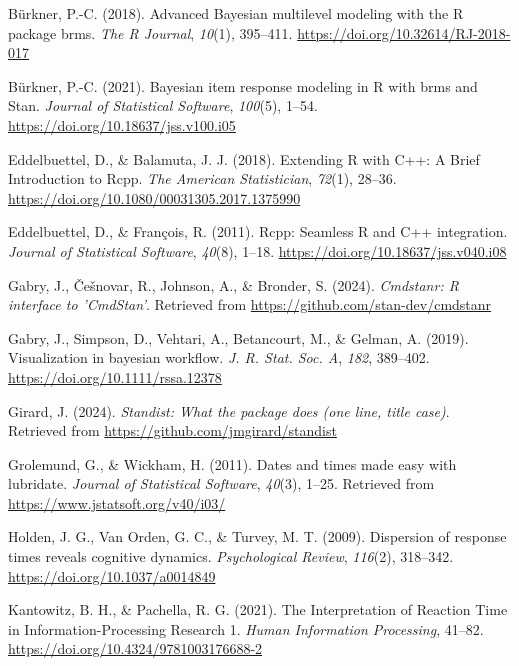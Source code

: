 \documentclass[
  man,floatsintext]{apa6}
\newlength{\cslhangindent}
\newenvironment{CSLReferences}[2] %
 {\begin{list}{}{%
  \setlength{\itemindent}{0pt}
  \setlength{\leftmargin}{0pt}
  \setlength{\parsep}{0pt}
  \ifodd #1
   \setlength{\leftmargin}{\cslhangindent}
   \setlength{\itemindent}{-1\cslhangindent}
  \fi
  \setlength{\itemsep}{#2\baselineskip}}}
 {\end{list}}
\begin{document}
\begin{CSLReferences}{1}{0}
Bürkner, P.-C. (2018). Advanced {Bayesian} multilevel modeling with the {R} package {brms}. \emph{The R Journal}, \emph{10}(1), 395--411. \url{https://doi.org/10.32614/RJ-2018-017}

Bürkner, P.-C. (2021). Bayesian item response modeling in {R} with {brms} and {Stan}. \emph{Journal of Statistical Software}, \emph{100}(5), 1--54. \url{https://doi.org/10.18637/jss.v100.i05}

Eddelbuettel, D., \& Balamuta, J. J. (2018). {Extending {R} with {C++}: A Brief Introduction to {Rcpp}}. \emph{The American Statistician}, \emph{72}(1), 28--36. \url{https://doi.org/10.1080/00031305.2017.1375990}

Eddelbuettel, D., \& François, R. (2011). {Rcpp}: Seamless {R} and {C++} integration. \emph{Journal of Statistical Software}, \emph{40}(8), 1--18. \url{https://doi.org/10.18637/jss.v040.i08}

Gabry, J., Češnovar, R., Johnson, A., \& Bronder, S. (2024). \emph{Cmdstanr: R interface to 'CmdStan'}. Retrieved from \url{https://github.com/stan-dev/cmdstanr}

Gabry, J., Simpson, D., Vehtari, A., Betancourt, M., \& Gelman, A. (2019). Visualization in bayesian workflow. \emph{J. R. Stat. Soc. A}, \emph{182}, 389--402. \url{https://doi.org/10.1111/rssa.12378}

Girard, J. (2024). \emph{Standist: What the package does (one line, title case)}. Retrieved from \url{https://github.com/jmgirard/standist}

Grolemund, G., \& Wickham, H. (2011). Dates and times made easy with {lubridate}. \emph{Journal of Statistical Software}, \emph{40}(3), 1--25. Retrieved from \url{https://www.jstatsoft.org/v40/i03/}

Holden, J. G., Van Orden, G. C., \& Turvey, M. T. (2009). Dispersion of response times reveals cognitive dynamics. \emph{Psychological Review}, \emph{116}(2), 318--342. \url{https://doi.org/10.1037/a0014849}

Kantowitz, B. H., \& Pachella, R. G. (2021). The {Interpretation} of {Reaction Time} in {Information-Processing Research} 1. \emph{Human Information Processing}, 41--82. \url{https://doi.org/10.4324/9781003176688-2}


\end{CSLReferences}
\end{document}
